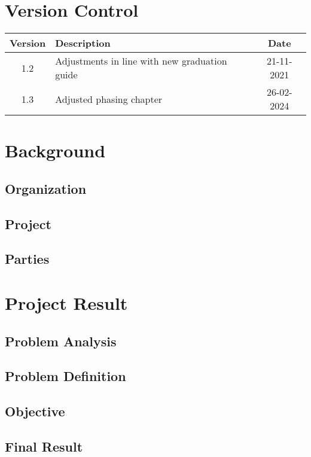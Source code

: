 \documentclass{article}
\begin{document}
\newpage

\section*{Version Control}

\begin{tabular}{|c|l|c|}
    \hline
    Version & Description & Date \\
    \hline
    1.2 & Adjustments in line with new graduation guide & 21-11-2021 \\
    1.3 & Adjusted phasing chapter & 26-02-2024 \\
    \hline
\end{tabular}

\newpage

\tableofcontents

\newpage
\section{Background}
\subsection{Organization}
\subsection{Project}
\subsection{Parties}


\newpage
\section{Project Result}
\subsection{Problem Analysis}
\subsection{Problem Definition}
\subsection{Objective}
\subsection{Final Result}
\end{document}

